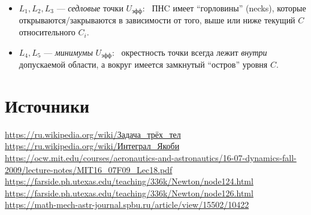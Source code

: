 \documentclass[12pt]{article}
\begin{document}
\begin{itemize}
  \item $L_1,L_2,L_3$ --- \emph{седловые} точки $U_{\mathrm{эфф}}$: \
        ПНC имеет ``горловины'' (necks), которые открываются/закрываются
        в зависимости от того, выше или ниже текущий $C$ относительного $C_i$.
  \item $L_4,L_5$ --- \emph{минимумы} $U_{\mathrm{эфф}}$: \
        окрестность точки всегда лежит {\it внутри} допускаемой области,
        а вокруг имеется замкнутый ``остров'' уровня $C$.
\end{itemize}

\section{Источники}

\url{https://ru.wikipedia.org/wiki/Задача_трёх_тел}\\
\url{https://ru.wikipedia.org/wiki/Интеграл_Якоби}\\
\url{https://ocw.mit.edu/courses/aeronautics-and-astronautics/16-07-dynamics-fall-2009/lecture-notes/MIT16_07F09_Lec18.pdf}\\
\url{https://farside.ph.utexas.edu/teaching/336k/Newton/node124.html}\\
\url{https://farside.ph.utexas.edu/teaching/336k/Newton/node126.html}\\
\url{https://math-mech-astr-journal.spbu.ru/article/view/15502/10422}\\
\end{document}
